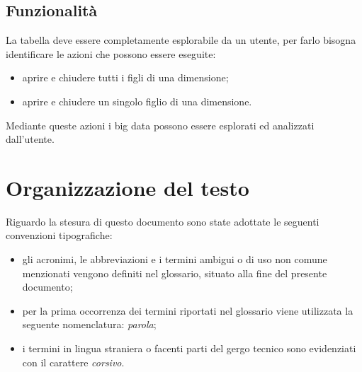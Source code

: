 \subsection{Funzionalità}
La tabella deve essere completamente esplorabile da un utente, per farlo bisogna identificare le azioni che possono essere eseguite:
\begin{itemize}
	\item aprire e chiudere tutti i figli di una dimensione;
	\item aprire e chiudere un singolo figlio di una dimensione.
\end{itemize}
Mediante queste azioni i big data possono essere esplorati ed analizzati dall'utente.

\section{Organizzazione del testo}
Riguardo la stesura di questo documento sono state adottate le seguenti convenzioni tipografiche:
\begin{itemize}
	\item gli acronimi, le abbreviazioni e i termini ambigui o di uso non comune menzionati vengono definiti nel glossario, situato alla fine del presente documento;
	\item per la prima occorrenza dei termini riportati nel glossario viene utilizzata la seguente nomenclatura: \emph{parola}\glo;
	\item i termini in lingua straniera o facenti parti del gergo tecnico sono evidenziati con il carattere \emph{corsivo}.
\end{itemize}